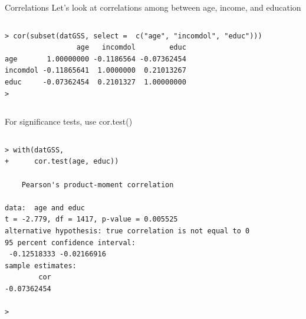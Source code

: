 \documentclass[table,smaller]{beamer}
\begin{document}
\begin{frame}[fragile,label=sec-7-4]{Correlations}
 Let's look at correlations among between age, income, and education
\vspace{-.5em}
\begin{columns}
\begin{block}{}
\begin{verbatim}
> cor(subset(datGSS, select =  c("age", "incomdol", "educ")))
                 age   incomdol        educ
age       1.00000000 -0.1186564 -0.07362454
incomdol -0.11865641  1.0000000  0.21013267
educ     -0.07362454  0.2101327  1.00000000
>
\end{verbatim}
\end{block}
\end{columns}
\vspace{.5em}


For significance tests, use cor.test()
\vspace{-.5em}
\begin{columns}
\begin{block}{}
\begin{verbatim}
> with(datGSS,
+      cor.test(age, educ))

	Pearson's product-moment correlation

data:  age and educ
t = -2.779, df = 1417, p-value = 0.005525
alternative hypothesis: true correlation is not equal to 0
95 percent confidence interval:
 -0.12518333 -0.02166916
sample estimates:
        cor 
-0.07362454 

>
\end{verbatim}
\end{block}
\end{columns}
\vspace{.5em}
\end{frame}
\end{document}
